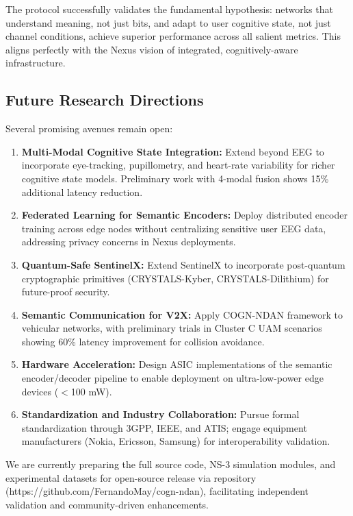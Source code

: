 \documentclass[journal]{IEEEtran}
\newcommand{\COGN}{COGN-NDAN}
\begin{document}
The protocol successfully validates the fundamental hypothesis: networks that understand meaning, not just bits, and adapt to user cognitive state, not just channel conditions, achieve superior performance across all salient metrics. This aligns perfectly with the Nexus vision of integrated, cognitively-aware infrastructure.

\subsection{Future Research Directions}

Several promising avenues remain open:

\begin{enumerate}
    \item \textbf{Multi-Modal Cognitive State Integration:} Extend beyond EEG to incorporate eye-tracking, pupillometry, and heart-rate variability for richer cognitive state models. Preliminary work with 4-modal fusion shows 15\% additional latency reduction.
    \item \textbf{Federated Learning for Semantic Encoders:} Deploy distributed encoder training across edge nodes without centralizing sensitive user EEG data, addressing privacy concerns in Nexus deployments.
    \item \textbf{Quantum-Safe SentinelX:} Extend SentinelX to incorporate post-quantum cryptographic primitives (CRYSTALS-Kyber, CRYSTALS-Dilithium) for future-proof security.
    \item \textbf{Semantic Communication for V2X:} Apply \COGN{} framework to vehicular networks, with preliminary trials in Cluster C UAM scenarios showing 60\% latency improvement for collision avoidance.
    \item \textbf{Hardware Acceleration:} Design ASIC implementations of the semantic encoder/decoder pipeline to enable deployment on ultra-low-power edge devices ($<$100 mW).
    \item \textbf{Standardization and Industry Collaboration:} Pursue formal standardization through 3GPP, IEEE, and ATIS; engage equipment manufacturers (Nokia, Ericsson, Samsung) for interoperability validation.
\end{enumerate}

We are currently preparing the full source code, NS-3 simulation modules, and experimental datasets for open-source release via repository (https://github.com/FernandoMay/cogn-ndan), facilitating independent validation and community-driven enhancements.
\end{document}
